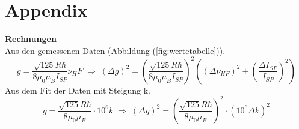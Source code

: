 \documentclass[a4paper,10pt]{scrartcl} %
\begin{document}
\section{Appendix}
\label{sec:appendix}
\textbf{Rechnungen}\\
Aus den gemessenen Daten (Abbildung (\ref{fig:wertetabelle})).
\begin{equation}
\label{eqn:g-Fehler1}
g = \frac{\sqrt{125} R \hbar}{8 \mu _0 \mu _B I_{SP}} \nu _HF \; \Rightarrow \; (\Delta g)^2 = (\frac{\sqrt{125} R \hbar}{8 \mu _0 \mu _B I_{SP}})^2( (\Delta \nu _{HF})^2 + (\frac{\Delta I_{SP}}{I_{SP}})^2)
\end{equation}
Aus dem Fit der Daten mit Steigung k.
\begin{equation}
\label{eqn:g-Fehler2}
g = \frac{\sqrt{125} R \hbar}{8 \mu _0 \mu _B} \cdot 10^6 k \; \Rightarrow \; (\Delta g)^2 = (\frac{\sqrt{125} R \hbar}{8 \mu _0 \mu _B})^2 \cdot (10^6 \Delta k)^2
\end{equation}
\end{document}
